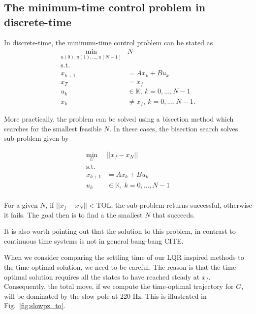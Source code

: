 \documentclass[journal,12pt,onecolumn,draftclsnofoot,,twoside]{IEEEtran/IEEEtran}
\begin{document}
\subsection{The minimum-time control problem in discrete-time}
\label{sec:org6d1d6b6}
In discrete-time, the minimum-time control problem can be stated as \cite{chen_minimumtime_cca}
\begin{align}
\min_{u(0), u(1),\dots,u(N-1)} & N\\
\text{s.t.}&\\
x_{k+1} & = Ax_{k} + Bu_{k}\\
x_{T} & = x_{f}\\
u_{k}&\in \mathds{K},~k=0,\dots,N-1\\
x_{k} &\neq x_{f},~k=0,\dots,N-1.
\end{align}

More practically, the problem can be solved using a bisection method which searches for the smallest feasible \(N\). In these cases, the bisection search solves sub-problem given by


\begin{align}
\min_{U}& || x_{f} - x_{N}||\\
\text{s.t.} &\\
x_{k+1} & = Ax_{k} + Bu_{k}\\
u_{k}&\in \mathds{K},~k=0,\dots,N-1\\
\end{align}

For a given \(N\), if \(||x_{f} - x_{N}|| < \text{TOL}\), the sub-problem returns successful, otherwise it fails. The goal then is to find a the smallest \(N\) that succeeds. 

It is also worth pointing out that the solution to this problem, in contrast to continuous time systems is not in general bang-bang CITE.

When we consider comparing the settling time of our LQR inspired methods to the time-optimal solution, we need to be careful.
The reason is that the time optimal solution requires all the states to have reached steady at $x_f$. Consequently, the total move, if we compute the time-optimal trajectory for $G$, will be dominated by the slow pole at 220 Hz. This is illustrated in Fig.~\ref{fig:slowpz_to}.
\end{document}
